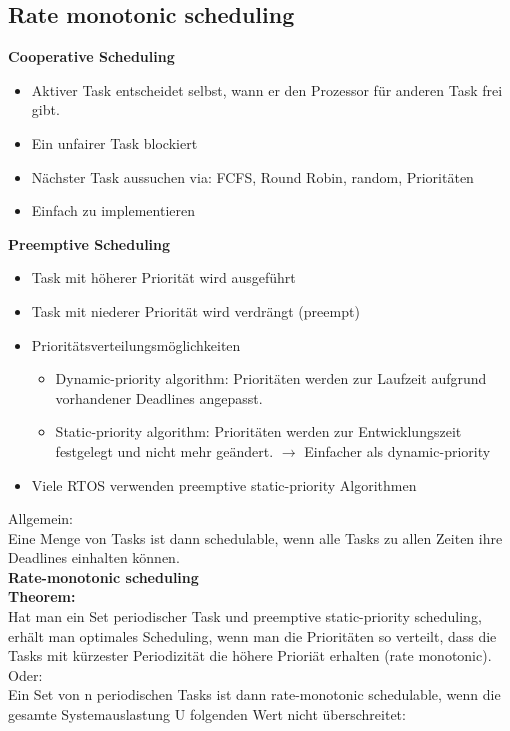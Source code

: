 \subsection{Rate monotonic scheduling}
\textbf{Cooperative Scheduling}
  \begin{itemize}
    \item Aktiver Task entscheidet selbst, wann er den Prozessor für anderen
    Task frei gibt. 
    \item Ein unfairer Task blockiert
    \item Nächster Task aussuchen via: FCFS, Round Robin, random, Prioritäten
    \item Einfach zu implementieren
  \end{itemize}
\textbf{Preemptive Scheduling}
  \begin{itemize}
    \item Task mit höherer Priorität wird ausgeführt
    \item Task mit niederer Priorität wird verdrängt (preempt)
    \item Prioritätsverteilungsmöglichkeiten
      \begin{itemize}
        \item Dynamic-priority algorithm: Prioritäten werden zur Laufzeit
        aufgrund vorhandener Deadlines angepasst. 
        \item Static-priority algorithm: Prioritäten werden zur Entwicklungszeit
        festgelegt und nicht mehr geändert. $\rightarrow$ Einfacher als
        dynamic-priority
      \end{itemize}
    \item Viele RTOS verwenden preemptive static-priority Algorithmen 
  \end{itemize}
Allgemein:\\ Eine Menge von Tasks ist dann schedulable, wenn alle Tasks zu
allen Zeiten ihre Deadlines einhalten können.\\
\textbf{Rate-monotonic scheduling}\\
\textbf{Theorem:}\\
Hat man ein Set periodischer Task und preemptive static-priority scheduling,
erhält man optimales Scheduling, wenn man die Prioritäten so verteilt, dass die
Tasks mit kürzester Periodizität die höhere Prioriät erhalten (rate
monotonic).\\
Oder:\\ 
Ein Set von n periodischen Tasks ist dann rate-monotonic schedulable, wenn die
gesamte Systemauslastung U folgenden Wert nicht überschreitet: 
